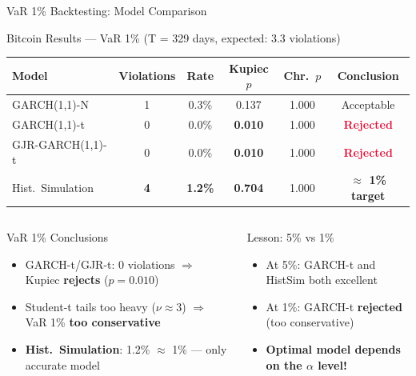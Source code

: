 \documentclass[9pt, aspectratio=169, t]{beamer}
\begin{document}
\begin{frame}{VaR 1\% Backtesting: Model Comparison}
    \vspace{-0.1cm}
    {\footnotesize
    \begin{block}{Bitcoin Results --- VaR 1\% (T = 329 days, expected: 3.3 violations)}
        \begin{center}
        \begin{tabular}{lccccc}
            \toprule
            \textbf{Model} & \textbf{Violations} & \textbf{Rate} & \textbf{Kupiec $p$} & \textbf{Chr.\ $p$} & \textbf{Conclusion} \\
            \midrule
            GARCH(1,1)-N & 1 & 0.3\% & 0.137 & 1.000 & Acceptable \\
            \rowcolor{Crimson!10} GARCH(1,1)-t & 0 & 0.0\% & \textbf{0.010} & 1.000 & \textcolor{Crimson}{\textbf{Rejected}} \\
            \rowcolor{Crimson!10} GJR-GARCH(1,1)-t & 0 & 0.0\% & \textbf{0.010} & 1.000 & \textcolor{Crimson}{\textbf{Rejected}} \\
            \rowcolor{Forest!15} Hist.\ Simulation & \textbf{4} & \textbf{1.2\%} & \textbf{0.704} & 1.000 & \textcolor{Forest}{\textbf{$\approx$ 1\% target}} \\
            \bottomrule
        \end{tabular}
        \end{center}
    \end{block}
    }

    \vspace{0.1cm}

    \begin{columns}[T]
        \begin{exampleblock}{VaR 1\% Conclusions}
            \begin{itemize}\setlength{\itemsep}{0pt}
                \item GARCH-t/GJR-t: 0 violations $\Rightarrow$ Kupiec \textbf{rejects} ($p = 0.010$)
                \item Student-t tails too heavy ($\nu \approx 3$) $\Rightarrow$ VaR 1\% \textbf{too conservative}
                \item \textbf{Hist.\ Simulation}: 1.2\% $\approx$ 1\% --- only accurate model
            \end{itemize}
        \end{exampleblock}

        \begin{alertblock}{Lesson: 5\% vs 1\%}
            \begin{itemize}\setlength{\itemsep}{0pt}
                \item At 5\%: GARCH-t and HistSim both excellent
                \item At 1\%: GARCH-t \textbf{rejected} (too conservative)
                \item \textbf{Optimal model depends on the $\alpha$ level!}
            \end{itemize}
        \end{alertblock}
    \end{columns}
\end{frame}
\end{document}
